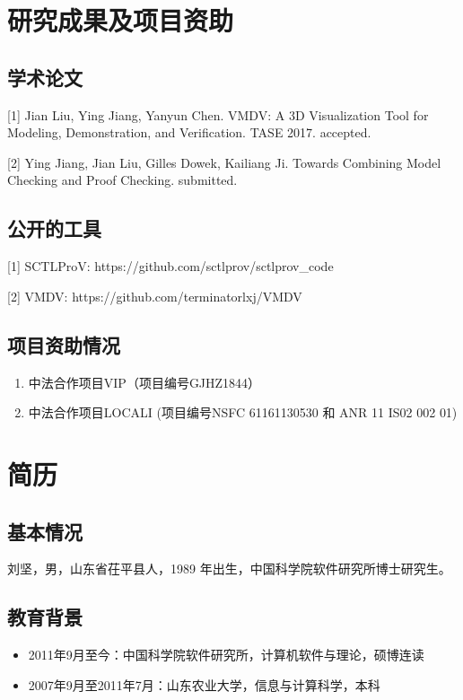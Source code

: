 \chapter{研究成果及项目资助}

\section*{学术论文}

\hspace{-0.9cm}[1] Jian Liu, Ying Jiang, Yanyun Chen. VMDV: A 3D Visualization Tool for Modeling, Demonstration, and Verification. TASE 2017. accepted.

\hspace{-0.9cm}[2] Ying Jiang, Jian Liu, Gilles Dowek, Kailiang Ji. Towards Combining Model Checking and Proof Checking. submitted.

\section*{公开的工具}
\hspace{-0.9cm} [1] SCTLProV: https://github.com/sctlprov/sctlprov\_code

\hspace{-0.9cm} [2] VMDV: https://github.com/terminatorlxj/VMDV

\section*{项目资助情况}
\begin{enumerate}
	\item 中法合作项目VIP（项目编号GJHZ1844）
	\item 中法合作项目LOCALI (项目编号NSFC 61161130530 和 ANR 11 IS02 002 01)
\end{enumerate}



\chapter{简历}

\section*{基本情况}

刘坚，男，山东省茌平县人，1989 年出生，中国科学院软件研究所博士研究生。

\section*{教育背景}
\begin{itemize}
	\item 2011年9月至今：中国科学院软件研究所，计算机软件与理论，硕博连读
	\item 2007年9月至2011年7月：山东农业大学，信息与计算科学，本科
\end{itemize}

